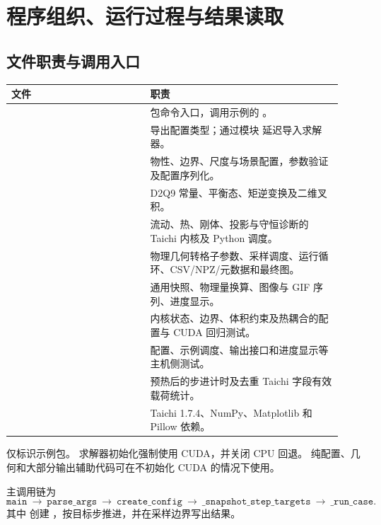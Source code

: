 \section{程序组织、运行过程与结果读取}
\label{sec:program}

\subsection{文件职责与调用入口}
\begin{longtable}{L{0.39\linewidth}L{0.54\linewidth}}
\toprule 文件 & 职责\\\midrule
\endhead
{} & 包命令入口，调用示例的 。\\
 & 导出配置类型；通过模块  延迟导入求解器。\\
 & 物性、边界、尺度与场景配置，参数验证及配置序列化。\\
 & D2Q9 常量、平衡态、矩逆变换及二维叉积。\\
 & 流动、热、刚体、投影与守恒诊断的 Taichi 内核及 Python 调度。\\
 & 物理几何转格子参数、采样调度、运行循环、CSV/NPZ/元数据和最终图。\\
 & 通用快照、物理量换算、图像与 GIF 序列、进度显示。\\
 & 内核状态、边界、体积约束及热耦合的配置与 CUDA 回归测试。\\
 & 配置、示例调度、输出接口和进度显示等主机侧测试。\\
 & 预热后的步进计时及去重 Taichi 字段有效载荷统计。\\
 & Taichi 1.7.4、NumPy、Matplotlib 和 Pillow 依赖。\\
\bottomrule
\end{longtable}
 仅标识示例包。
求解器初始化强制使用 CUDA，并关闭 CPU 回退。
纯配置、几何和大部分输出辅助代码可在不初始化 CUDA 的情况下使用。

主调用链为
\begin{equation*}
 \texttt{main}\ \longrightarrow\ \texttt{parse\_args}\ \longrightarrow\
 \texttt{create\_config}\ \longrightarrow\ \texttt{\_snapshot\_step\_targets}
 \ \longrightarrow\ \texttt{\_run\_case}.
\end{equation*}
其中  创建 ，按目标步推进，并在采样边界写出结果。

